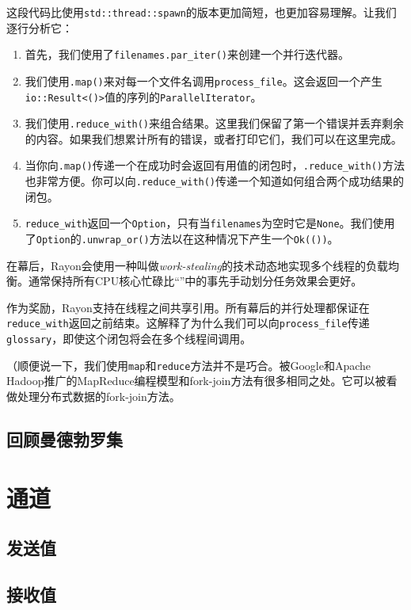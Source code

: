这段代码比使用\texttt{std::thread::spawn}的版本更加简短，也更加容易理解。让我们逐行分析它：
\begin{enumerate}
    \item 首先，我们使用了\texttt{filenames.par\_iter()}来创建一个并行迭代器。
    \item 我们使用\texttt{.map()}来对每一个文件名调用\texttt{process\_file}。这会返回一个产生\texttt{io::Result<()>}值的序列的\texttt{ParallelIterator}。
    \item 我们使用\texttt{.reduce\_with()}来组合结果。这里我们保留了第一个错误并丢弃剩余的内容。如果我们想累计所有的错误，或者打印它们，我们可以在这里完成。
    \item 当你向\texttt{.map()}传递一个在成功时会返回有用值的闭包时，\texttt{.reduce\_with()}方法也非常方便。你可以向\texttt{.reduce\_with()}传递一个知道如何组合两个成功结果的闭包。
    \item \texttt{reduce\_with}返回一个\texttt{Option}，只有当\texttt{filenames}为空时它是\texttt{None}。我们使用了\texttt{Option}的\texttt{.unwrap\_or()}方法以在这种情况下产生一个\texttt{Ok(())}。
\end{enumerate}

在幕后，Rayon会使用一种叫做\emph{work-stealing}的技术动态地实现多个线程的负载均衡。通常保持所有CPU核心忙碌比“”中的事先手动划分任务效果会更好。

作为奖励，Rayon支持在线程之间共享引用。所有幕后的并行处理都保证在\texttt{reduce\_with}返回之前结束。这解释了为什么我们可以向\texttt{process\_file}传递\texttt{glossary}，即使这个闭包将会在多个线程间调用。

（顺便说一下，我们使用\texttt{map}和\texttt{reduce}方法并不是巧合。被Google和Apache Hadoop推广的MapReduce编程模型和fork-join方法有很多相同之处。它可以被看做处理分布式数据的fork-join方法。

\subsection{回顾曼德勃罗集}

\section{通道}

\subsection{发送值}

\subsection{接收值}


